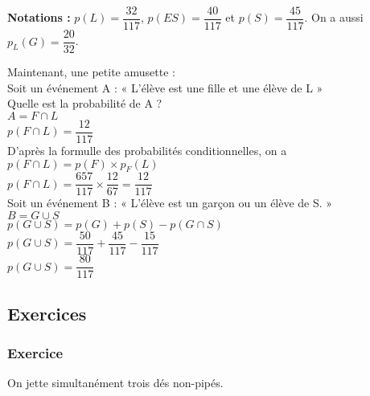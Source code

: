 \textbf{Notations :} $p\left(L\right) = \dfrac{32}{117}$, $p\left(ES\right) = \dfrac{40}{117} $ et $p\left(S\right) = \dfrac{45}{117}$. On a aussi $p_L\left(G\right) = \dfrac{20}{32}$. \\

\newpage

Maintenant, une petite amusette : \\

Soit un événement A : « L'élève est une fille et une élève de L » \\ Quelle est la probabilité de A ? \\

$ A = F \cap L $ \\

$p\left(F\cap L\right) = \dfrac{12}{117} $ \\

D'après la formulle des probabilités conditionnelles, on a $p\left(F\cap L\right) = p\left(F\right) \times p_F\left(L\right) $ \\

$p\left(F\cap L\right) = \dfrac{657}{117} \times \dfrac{12}{67} = \dfrac{12}{117} $\\

Soit un événement B : « L'élève est un garçon ou un élève de S. » \\

$ B = G\cup S$ \\

$p\left(G\cup S\right) = p\left(G\right) + p\left(S\right) - p\left(G\cap S\right) $ \\

$p\left(G\cup S\right) = \dfrac{50}{117} + \dfrac{45}{117} - \dfrac{15}{117} $ \\

$p\left(G\cup S\right) = \dfrac{80}{117} $ \\

\newpage

\subsection{Exercices}

\subsubsection{Exercice }

On jette simultanément trois dés non-pipés. \\ 

